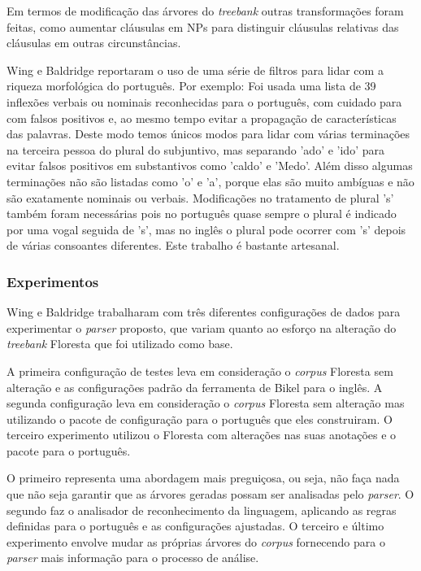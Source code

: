 Em termos de modificação das árvores do \emph{treebank} outras transformações foram feitas, como aumentar cláusulas em NPs para distinguir cláusulas relativas das cláusulas em outras circunstâncias.

Wing e Baldridge reportaram o uso de uma série de filtros para lidar com a riqueza morfológica do português. Por exemplo: Foi usada uma lista de 39 inflexões verbais ou nominais reconhecidas para o português, com cuidado para com falsos positivos e, ao mesmo tempo evitar a propagação de características das palavras. Deste modo temos únicos modos para lidar com várias terminações na terceira pessoa do plural do subjuntivo, mas separando 'ado' e 'ido' para evitar falsos positivos em substantivos como 'caldo' e 'Medo'. Além disso algumas terminações não são listadas como 'o' e 'a', porque elas são muito ambíguas e não são exatamente nominais ou verbais. Modificações no tratamento de plural 's' também foram necessárias pois no português quase sempre o plural é indicado por uma vogal seguida de 's', mas no inglês o plural pode ocorrer com 's' depois de várias consoantes diferentes. Este trabalho é bastante artesanal.


\subsubsection{Experimentos} %
\label{sec:wing_baldridge_experimentos}

Wing e Baldridge trabalharam com três diferentes configurações de dados para experimentar o \emph{parser} proposto, que variam quanto ao esforço na alteração do \emph{treebank} Floresta que foi utilizado como base.

A primeira configuração de testes leva em consideração o \emph{corpus} Floresta sem alteração e as configurações padrão da ferramenta de Bikel para o inglês. A segunda configuração leva em consideração o \emph{corpus} Floresta sem alteração mas utilizando o pacote de configuração para o português que eles construiram. O terceiro experimento utilizou o Floresta com alterações nas suas anotações e o pacote para o português.

O primeiro representa uma abordagem mais preguiçosa, ou seja, não faça nada que não seja garantir que as árvores geradas possam ser analisadas pelo \emph{parser}. O segundo faz o analisador de reconhecimento da linguagem, aplicando as regras definidas para o português e as configurações ajustadas. O terceiro e último experimento envolve mudar as próprias árvores do \emph{corpus} fornecendo para o \emph{parser} mais informação para o processo de análise.

